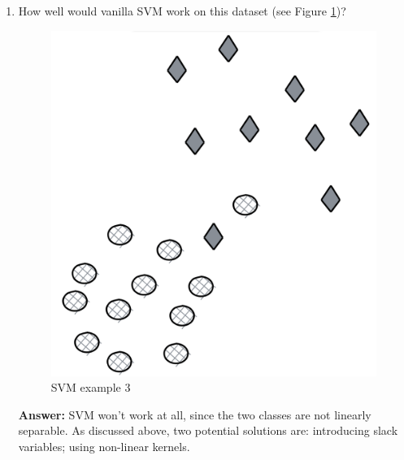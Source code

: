 \documentclass{article}
\newenvironment{QandA}{\begin{enumerate}[label=\arabic*.]}{\end{enumerate}}
\newenvironment{InnerQandA}{\begin{enumerate}[label=\roman*.]}{\end{enumerate}}
\newenvironment{answer}{\par\normalfont \textbf{Answer:}}{}
\begin{document}
\begin{QandA}
\begin{InnerQandA}
        \item How well would vanilla SVM work on this dataset (see Figure \ref{fig:svm-example-3})?
        \begin{figure}[htb!]
            \centering
            \includegraphics[width=0.3\columnwidth]{img/svm-example-3.png}
            \caption{SVM example 3}
            \label{fig:svm-example-3}
        \end{figure}
        \begin{answer}
            SVM won't work at all, since the two classes are not linearly separable. As discussed above, two potential solutions are: introducing slack variables; using non-linear kernels.
        \end{answer}
    \end{InnerQandA}
    
\end{QandA}
\end{document}
